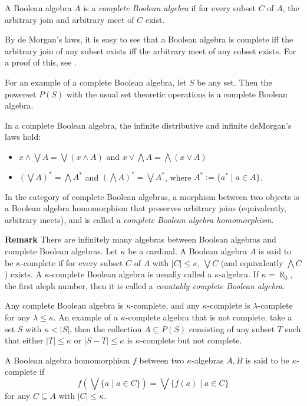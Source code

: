 \documentclass[12pt]{article}
\begin{document}
A Boolean algebra $A$ is a \emph{complete Boolean algebra} if for every subset $C$ of $A$, the arbitrary join and arbitrary meet of $C$ exist.

By de Morgan's laws, it is easy to see that a Boolean algebra is complete iff the arbitrary join of any subset exists iff the arbitrary meet of any subset exists.  For a proof of this, see .

For an example of a complete Boolean algebra, let $S$ be any set.  Then the powerset $P(S)$ with the usual set theoretic operations is a complete Boolean algebra.

In a complete Boolean algebra, the infinite distributive and infinite deMorgan's laws hold:
\begin{itemize}
\item $x\wedge \bigvee A = \bigvee (x\wedge A)$ and $x\vee \bigwedge A = \bigwedge (x\vee A)$
\item $(\bigvee A)^* = \bigwedge A^*$ and $(\bigwedge A)^* = \bigvee A^*$, where $A^*:=\lbrace a^* \mid a\in A\rbrace$.
\end{itemize}

In the category of complete Boolean algebras, a morphism between two objects is a Boolean algebra homomorphism that preserves arbitrary joins (equivalently, arbitrary meets), and is called a \emph{complete Boolean algebra homomorphism}.

\textbf{Remark}  There are infinitely many algebras between Boolean algebras and complete Boolean algebras.  Let $\kappa$ be a cardinal.  A Boolean algebra $A$ is said to be $\kappa$-complete if for every subset $C$ of $A$ with $|C|\le \kappa$, $\bigvee C$ (and equivalently $\bigwedge C$) exists.  A $\kappa$-complete Boolean algebra is usually called a $\kappa$-algebra.  If $\kappa=\aleph_0$, the first aleph number, then it is called a \emph{countably complete Boolean algebra}.  

Any complete Boolean algebra is $\kappa$-complete, and any $\kappa$-complete is $\lambda$-complete for any $\lambda\le \kappa$.  An example of a $\kappa$-complete algebra that is not complete, take a set $S$ with $\kappa < |S|$, then the collection $A\subseteq P(S)$ consisting of any subset $T$ such that either $|T|\le \kappa$ or $|S-T|\le \kappa$ is $\kappa$-complete but not complete.

A Boolean algebra homomorphism $f$ between two $\kappa$-algebras $A,B$ is said to be $\kappa$-complete if $$f(\bigvee \lbrace a \mid a\in C\rbrace)= \bigvee \lbrace f(a)\mid a\in C\rbrace $$ for any $C\subseteq A$ with $|C|\le \kappa$.
\end{document}
